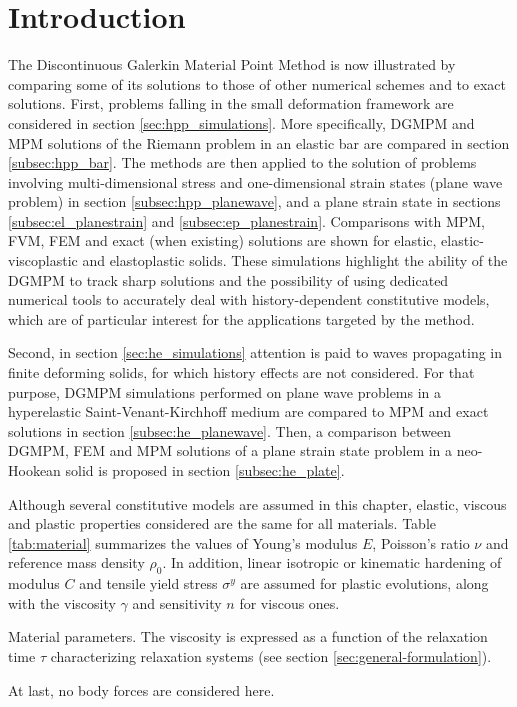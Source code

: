 \section*{Introduction}
The Discontinuous Galerkin Material Point Method is now illustrated by comparing some of its solutions to those of other numerical schemes and to exact solutions.  
First, problems falling in the small deformation framework are considered in section \ref{sec:hpp_simulations}. More specifically, DGMPM and MPM solutions of the Riemann problem in an elastic bar are compared in section \ref{subsec:hpp_bar}. The methods are then applied to the solution of problems involving multi-dimensional stress and one-dimensional strain states (plane wave problem) in section \ref{subsec:hpp_planewave}, and a plane strain state in sections \ref{subsec:el_planestrain} and \ref{subsec:ep_planestrain}. Comparisons with MPM, FVM, FEM and exact (when existing) solutions are shown for elastic, elastic-viscoplastic and elastoplastic solids.
These simulations highlight the ability of the DGMPM to track sharp solutions and the possibility of using dedicated numerical tools to accurately deal with history-dependent constitutive models, which are of particular interest for the applications targeted by the method. 

Second, in section \ref{sec:he_simulations} attention is paid to waves propagating in finite deforming solids, for which history effects are not considered.
For that purpose, DGMPM simulations performed on plane wave problems in a hyperelastic Saint-Venant-Kirchhoff medium are compared to MPM and exact solutions in section \ref{subsec:he_planewave}. Then, a comparison between DGMPM, FEM and MPM solutions of a plane strain state problem in a neo-Hookean solid is proposed in section \ref{subsec:he_plate}.

Although several constitutive models are assumed in this chapter, elastic, viscous and plastic properties considered are the same for all materials. Table \ref{tab:material} summarizes the values of Young's modulus $E$, Poisson's ratio $\nu$ and reference mass density $\rho_0$.
In addition, linear isotropic or kinematic hardening of modulus $C$ and tensile yield stress $\sigma^y$ are assumed for plastic evolutions, along with the viscosity $\gamma$ and sensitivity $n$ for viscous ones.
\begin{table}[h!]
  \centering
  
  \caption{Material parameters. The viscosity is expressed as a function of the relaxation time $\tau$ characterizing relaxation systems (see section \ref{sec:general-formulation}).}
  \label{tab:material}
\end{table}
At last, no body forces are considered here.
